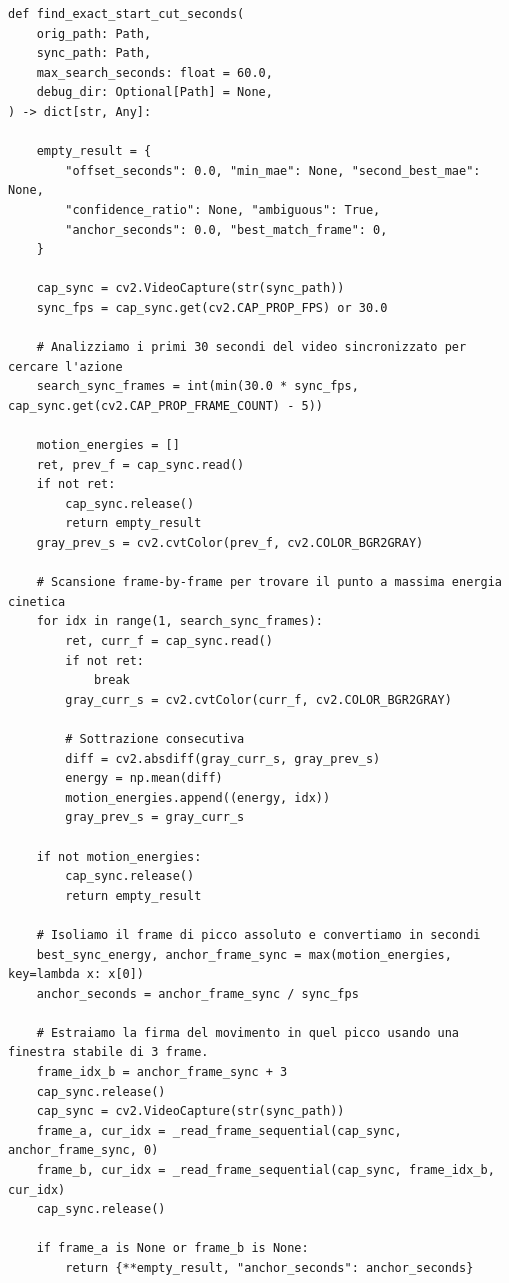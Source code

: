 \begin{lstlisting}[style=pythonstyle, caption={Estrazione del ground truth temporale tramite matching della dinamica}, label={lst:dynamic_between_two_frame}]
def find_exact_start_cut_seconds(
    orig_path: Path,
    sync_path: Path,
    max_search_seconds: float = 60.0,
    debug_dir: Optional[Path] = None,
) -> dict[str, Any]:

    empty_result = {
        "offset_seconds": 0.0, "min_mae": None, "second_best_mae": None,
        "confidence_ratio": None, "ambiguous": True,
        "anchor_seconds": 0.0, "best_match_frame": 0,
    }

    cap_sync = cv2.VideoCapture(str(sync_path))
    sync_fps = cap_sync.get(cv2.CAP_PROP_FPS) or 30.0

    # Analizziamo i primi 30 secondi del video sincronizzato per cercare l'azione
    search_sync_frames = int(min(30.0 * sync_fps, cap_sync.get(cv2.CAP_PROP_FRAME_COUNT) - 5))

    motion_energies = []
    ret, prev_f = cap_sync.read()
    if not ret:
        cap_sync.release()
        return empty_result
    gray_prev_s = cv2.cvtColor(prev_f, cv2.COLOR_BGR2GRAY)

    # Scansione frame-by-frame per trovare il punto a massima energia cinetica
    for idx in range(1, search_sync_frames):
        ret, curr_f = cap_sync.read()
        if not ret:
            break
        gray_curr_s = cv2.cvtColor(curr_f, cv2.COLOR_BGR2GRAY)

        # Sottrazione consecutiva 
        diff = cv2.absdiff(gray_curr_s, gray_prev_s)
        energy = np.mean(diff)
        motion_energies.append((energy, idx))
        gray_prev_s = gray_curr_s

    if not motion_energies:
        cap_sync.release()
        return empty_result

    # Isoliamo il frame di picco assoluto e convertiamo in secondi
    best_sync_energy, anchor_frame_sync = max(motion_energies, key=lambda x: x[0])
    anchor_seconds = anchor_frame_sync / sync_fps

    # Estraiamo la firma del movimento in quel picco usando una finestra stabile di 3 frame.
    frame_idx_b = anchor_frame_sync + 3
    cap_sync.release()
    cap_sync = cv2.VideoCapture(str(sync_path))
    frame_a, cur_idx = _read_frame_sequential(cap_sync, anchor_frame_sync, 0)
    frame_b, cur_idx = _read_frame_sequential(cap_sync, frame_idx_b, cur_idx)
    cap_sync.release()

    if frame_a is None or frame_b is None:
        return {**empty_result, "anchor_seconds": anchor_seconds}


\end{lstlisting}
